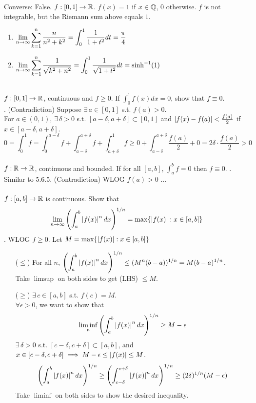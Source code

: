 Converse: False. $f:[0, 1]\rightarrow \mathbb{R}$. $f(x) = 1$ if $x\in \mathbb{Q}$, $0$ otherwise. $f$ is not integrable, but the Riemann sum above equals $1$.
\\
\prob{} 
\begin{enumerate}
	\item $\displaystyle \lim_{n\rightarrow\infty} \sum_{k=1}^n \frac{n}{n^2+k^2} = \int_0^1 \frac{1}{1+t^2}dt = \frac{\pi}{4}$ 
	\item $\displaystyle \lim_{n\rightarrow\infty} \sum_{k=1}^n \frac{1}{\sqrt{k^2+n^2}} = \int_0^1 \frac{1}{\sqrt{1+t^2}}dt = \sinh^{-1}(1)$
\end{enumerate}~\\
 $f:[0, 1]\rightarrow\mathbb{R}$, continuous and $f\geq 0$. If $\int_0^1 f(x)dx = 0$, show that $f \equiv 0$.\\
\pf. (Contradiction) Suppose $\exists\,a\in[0, 1]$ s.t. $f(a) > 0$.\\
For $a\in (0, 1)$, $\exists\,\delta > 0$ s.t. $[a-\delta, a +\delta] \subset [0, 1]$ and $\left|f(x) - f(a)\right| < \frac{f(a)}{2}$ if $x\in [a-\delta, a+\delta]$.
$$0 =\int_0^1 f = \int_0^{a-\delta} f + \int_{a-\delta}^{a+\delta} f+ \int_{a+\delta}^1 f \geq 0 + \int_{a-\delta}^{a+\delta} \frac{f(a)}{2} + 0 = 2\delta \cdot \frac{f(a)}{2} > 0$$
\\
 $f:\mathbb{R}\rightarrow\mathbb{R}$, continuous and bounded. If for all $[a, b]$, $\int_a^b f = 0$ then $f\equiv 0$.
\pf. Similar to 5.6.5. (Contradiction) WLOG $f(a) > 0$ ...\\
\\
 $f:[a, b]\rightarrow\mathbb{R}$ is continuous. Show that
$$\lim_{n\rightarrow\infty} \left(\int_a^b \left|f(x)\right|^n dx\right)^{1/n} = \max\{\left|f(x)\right|: x\in [a, b] \}$$
\pf. WLOG $f\geq 0$. Let $M = \max\{\left|f(x)\right|: x\in [a, b]\}$
\begin{enumerate}
	\item[($\leq$)] For all $n$, $\displaystyle \left(\int_a^b \left|f(x)\right|^n dx\right)^{1/n} \leq (M^n (b-a))^{1/n} = M(b-a)^{1/n}$.\\
	Take $\limsup$ on both sides to get (LHS) $\leq M$.
	\item[($\geq$)] $\exists\,c\in[a, b]$ s.t. $f(c) = M$.\\
	$\forall\epsilon > 0$, we want to show that $$\liminf_n \left(\int_a^b \left|f(x)\right|^ndx\right)^{1/n} \geq M - \epsilon$$
	$\exists\,\delta >0$ s.t. $[c-\delta, c+\delta]\subset [a, b]$, and $x\in [c-\delta, c+\delta] \implies M - \epsilon \leq \left|f(x)\right| \leq M$.
	$$\left(\int_a^b \left|f(x)\right|^ndx\right)^{1/n} \geq \left(\int_{c-\delta}^{c+\delta} \left|f(x)\right|^n dx\right)^{1/n} \geq (2\delta)^{1/n} (M-\epsilon)$$
	Take $\liminf$ on both sides to show the desired inequality.
\end{enumerate}

\pagebreak